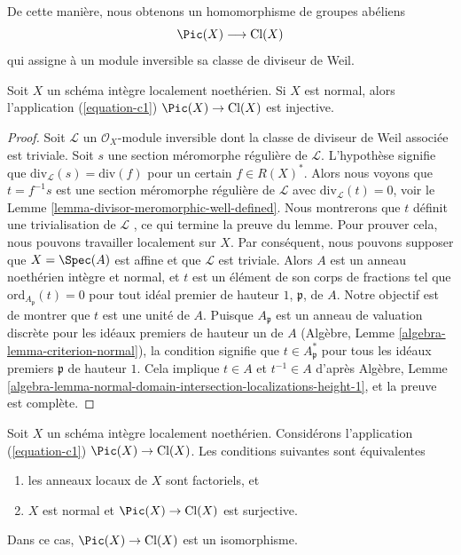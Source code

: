 \noindent
De cette manière, nous obtenons un homomorphisme de groupes abéliens
\begin{equation}
\label{equation-c1}
\Pic(X) \longrightarrow \text{Cl}(X)
\end{equation}
qui assigne à un module inversible sa classe de diviseur de Weil.

\begin{lemma}
\label{lemma-normal-c1-injective}
Soit  $X$  un schéma intègre localement noethérien. Si  $X$  est
normal, alors l'application (\ref{equation-c1})  $\Pic(X) \to \text{Cl}(X)$  est injective.
\end{lemma}

\begin{proof}
Soit  $\mathcal{L}$  un  $\mathcal{O}_X$-module inversible dont la classe de diviseur de
Weil associée est triviale. Soit  $s$  une section méromorphe régulière de
 $\mathcal{L}$. L'hypothèse signifie que  $\text{div}_\mathcal{L}(s) = \text{div}(f)$  pour un certain  $f \in R(X)^*$.
Alors nous voyons que  $t = f^{-1}s$  est une section méromorphe régulière de
 $\mathcal{L}$  avec  $\text{div}_\mathcal{L}(t) = 0$, voir le Lemme  \ref{lemma-divisor-meromorphic-well-defined}. Nous montrerons que
 $t$  définit une trivialisation de  $\mathcal{L}$ , ce qui termine la preuve
du lemme. Pour prouver cela, nous pouvons travailler localement sur  $X$.
Par conséquent, nous pouvons supposer que  $X = \Spec(A)$  est affine et que
 $\mathcal{L}$  est triviale. Alors  $A$  est un anneau noethérien intègre et normal, et
 $t$  est un élément de son corps de fractions tel que  $\text{ord}_{A_\mathfrak p}(t) = 0$  pour
tout idéal premier de hauteur  $1$,  $\mathfrak p$, de  $A$. Notre
objectif est de montrer que  $t$  est une unité de  $A$. Puisque
 $A_\mathfrak p$  est un anneau de valuation discrète pour les idéaux premiers de hauteur un
de  $A$  (Algèbre, Lemme  \ref{algebra-lemma-criterion-normal}), la condition signifie que
 $t \in A_\mathfrak p^*$  pour tous les idéaux premiers  $\mathfrak p$  de hauteur  $1$. Cela
implique  $t \in A$  et  $t^{-1} \in A$  d'après Algèbre, Lemme  \ref{algebra-lemma-normal-domain-intersection-localizations-height-1}, et la
preuve est complète.
\end{proof}

\begin{lemma}
\label{lemma-local-rings-UFD-c1-bijective}
Soit  $X$  un schéma intègre localement noethérien. Considérons l'application
(\ref{equation-c1})  $\Pic(X) \to \text{Cl}(X)$. Les conditions suivantes sont équivalentes
\begin{enumerate}
\item les anneaux locaux de  $X$  sont factoriels, et
\item $X$  est normal et  $\Pic(X) \to \text{Cl}(X)$  est surjective.
\end{enumerate}
Dans ce cas,  $\Pic(X) \to \text{Cl}(X)$  est un isomorphisme.
\end{lemma}

